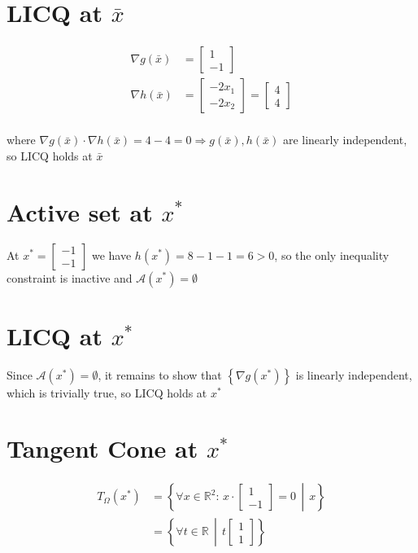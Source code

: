 \documentclass[oneside, a4paper]{book}
\newcommand\br[1]{\left(#1\right)}
\begin{document}
\section{LICQ at $\bar{x}$}

\begin{align}
    \nabla g(\bar{x}) &= \begin{bmatrix}1\\-1\end{bmatrix}\\
    \nabla h(\bar{x}) &= \begin{bmatrix}-2x_1\\-2x_2\end{bmatrix}
    = \begin{bmatrix}4\\4\end{bmatrix}\\
\end{align}

where $\nabla g(\bar{x}) \cdot \nabla h(\bar{x}) = 4-4 = 0 \Longrightarrow g(\bar{x}), h(\bar{x})$ are linearly independent, so LICQ holds at $\bar{x}$

\section{Active set at $x^*$}
At $x^* = \begin{bmatrix}-1\\-1\end{bmatrix}$ we have $h(x^*) = 8-1-1 = 6 > 0$, so the only inequality constraint is inactive and $\mathcal{A}\br{x^*}=\emptyset$

\section{LICQ at $x^*$}

Since $\mathcal{A}\br{x^*}=\emptyset$, it remains to show that $\left\{ \nabla g(x^*) \right\}$ is linearly independent, which is trivially true, so LICQ holds at $x^*$

\section{Tangent Cone at $x^*$}

\begin{align}
    T_{\Omega}\br{x^*} &= \left\{
       \forall x\in\mathds{R}^2 :\,
       x \cdot  \begin{bmatrix}1\\-1\end{bmatrix} = 0
       \,\middle |\, 
       x
    \right\}\\
    &= \left\{
       \forall t\in\mathds{R} \,\middle |\, 
       t \begin{bmatrix}1\\1\end{bmatrix}
    \right\}
\end{align}
\end{document}
